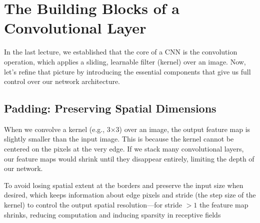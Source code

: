 \documentclass{article}
\begin{document}
\section{The Building Blocks of a Convolutional Layer}

In the last lecture, we established that the core of a CNN is the convolution operation, which applies a sliding, learnable filter (kernel) over an image. Now, let's refine that picture by introducing the essential components that give us full control over our network architecture.

\subsection{Padding: Preserving Spatial Dimensions}

When we convolve a kernel (e.g., 3×3) over an image, the output feature map is slightly smaller than the input image. This is because the kernel cannot be centered on the pixels at the very edge. If we stack many convolutional layers, our feature maps would shrink until they disappear entirely, limiting the depth of our network.

To avoid losing spatial extent at the borders and preserve the input size when desired, which keeps information about edge pixels and stride (the step size of the kernel) to control the output spatial resolution—for stride $>1$ the feature map shrinks, reducing computation and inducing sparsity in receptive fields
\end{document}
